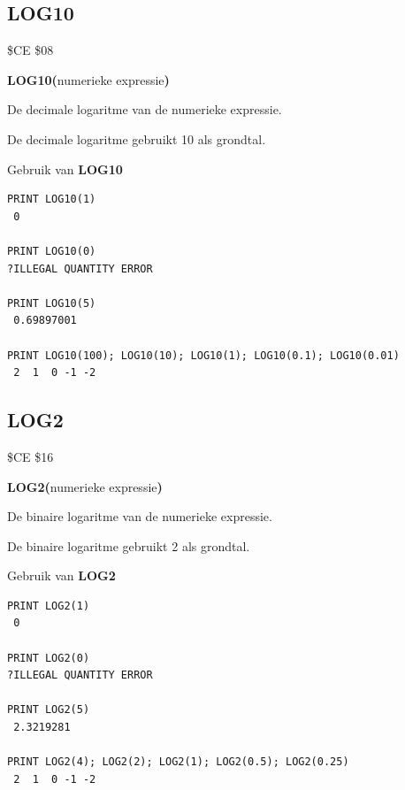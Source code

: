 \subsection{LOG10}
\begin{description}[leftmargin=2cm,style=nextline]
\item [Token:]    \$CE \$08

\item [Formaat:]   {\bf LOG10(}numerieke expressie{\bf)}

\item [Retourneert:]  De decimale logaritme van de numerieke expressie.

                  De decimale logaritme gebruikt 10 als grondtal.

\item [Voorbeelden:] Gebruik van {\bf LOG10}

\begin{tcolorbox}[colback=black,coltext=white]
\verbatimfont{\codefont}
\begin{verbatim}
PRINT LOG10(1)
 0

PRINT LOG10(0)
?ILLEGAL QUANTITY ERROR

PRINT LOG10(5)
 0.69897001

PRINT LOG10(100); LOG10(10); LOG10(1); LOG10(0.1); LOG10(0.01)
 2  1  0 -1 -2
\end{verbatim}
\end{tcolorbox}
\end{description}


\newpage
\subsection{LOG2}
\begin{description}[leftmargin=2cm,style=nextline]
\item [Token:]    \$CE \$16

\item [Formaat:]   {\bf LOG2(}numerieke expressie{\bf)}

\item [Retourneert:]  De binaire logaritme van de numerieke expressie.

                  De binaire logaritme gebruikt 2 als grondtal.

\item [Voorbeelden:] Gebruik van {\bf LOG2}

\begin{tcolorbox}[colback=black,coltext=white]
\verbatimfont{\codefont}
\begin{verbatim}
PRINT LOG2(1)
 0

PRINT LOG2(0)
?ILLEGAL QUANTITY ERROR

PRINT LOG2(5)
 2.3219281

PRINT LOG2(4); LOG2(2); LOG2(1); LOG2(0.5); LOG2(0.25)
 2  1  0 -1 -2
\end{verbatim}
\end{tcolorbox}
\end{description}


